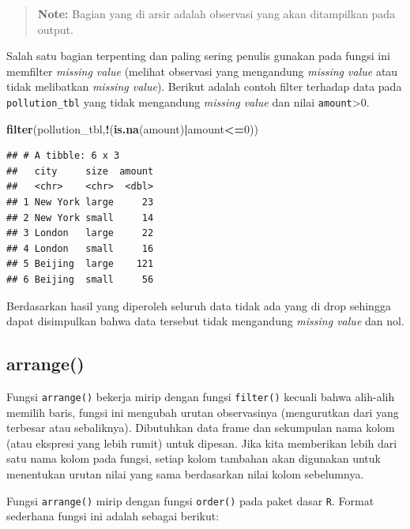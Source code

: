 \documentclass[]{book}
\newenvironment{Shaded}{\begin{snugshade}}{\end{snugshade}}
\newcommand{\KeywordTok}[1]{\textcolor[rgb]{0.13,0.29,0.53}{\textbf{#1}}}
\newcommand{\DecValTok}[1]{\textcolor[rgb]{0.00,0.00,0.81}{#1}}
\newcommand{\OperatorTok}[1]{\textcolor[rgb]{0.81,0.36,0.00}{\textbf{#1}}}
\newcommand{\NormalTok}[1]{#1}
\begin{document}
\begin{quote}
\textbf{Note: } Bagian yang di arsir adalah observasi yang akan
ditampilkan pada output.
\end{quote}

Salah satu bagian terpenting dan paling sering penulis gunakan pada
fungsi ini memfilter \emph{missing value} (melihat observasi yang
mengandung \emph{missing value} atau tidak melibatkan \emph{missing
value}). Berikut adalah contoh filter terhadap data pada
\texttt{pollution\_tbl} yang tidak mengandung \emph{missing value} dan
nilai \texttt{amount}\textgreater{}0.

\begin{Shaded}
\begin{Highlighting}[]
\KeywordTok{filter}\NormalTok{(pollution_tbl,}\OperatorTok{!}\NormalTok{(}\KeywordTok{is.na}\NormalTok{(amount)}\OperatorTok{|}\NormalTok{amount}\OperatorTok{<=}\DecValTok{0}\NormalTok{))}
\end{Highlighting}
\end{Shaded}

\begin{verbatim}
## # A tibble: 6 x 3
##   city     size  amount
##   <chr>    <chr>  <dbl>
## 1 New York large     23
## 2 New York small     14
## 3 London   large     22
## 4 London   small     16
## 5 Beijing  large    121
## 6 Beijing  small     56
\end{verbatim}

Berdasarkan hasil yang diperoleh seluruh data tidak ada yang di drop
sehingga dapat disimpulkan bahwa data tersebut tidak mengandung
\emph{missing value} dan nol.

\subsection{arrange()}\label{arrange}

Fungsi \texttt{arrange()} bekerja mirip dengan fungsi \texttt{filter()}
kecuali bahwa alih-alih memilih baris, fungsi ini mengubah urutan
observasinya (mengurutkan dari yang terbesar atau sebaliknya).
Dibutuhkan data frame dan sekumpulan nama kolom (atau ekspresi yang
lebih rumit) untuk dipesan. Jika kita memberikan lebih dari satu nama
kolom pada fungsi, setiap kolom tambahan akan digunakan untuk menentukan
urutan nilai yang sama berdasarkan nilai kolom sebelumnya.

Fungsi \texttt{arrange()} mirip dengan fungsi \texttt{order()} pada
paket dasar \texttt{R}. Format sederhana fungsi ini adalah sebagai
berikut:
\end{document}
